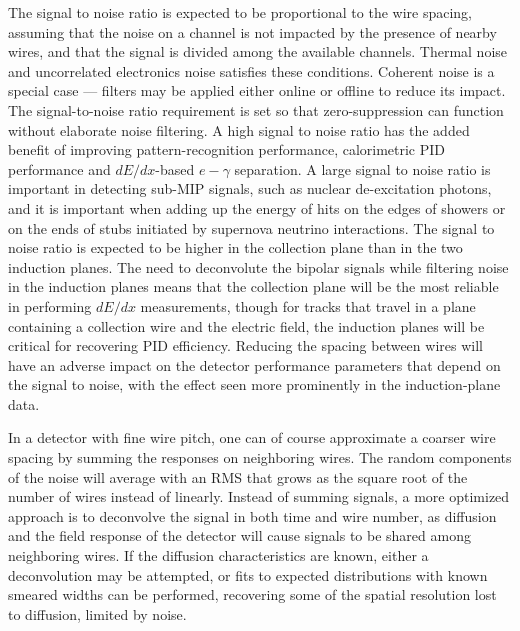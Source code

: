 The signal to noise ratio is expected to be proportional to the wire
spacing, assuming that the noise on a channel is not impacted by the
presence of nearby wires, and that the signal is divided among the
available channels.  Thermal noise and uncorrelated electronics noise
satisfies these conditions.  Coherent noise is a special case ---
filters may be applied either online or offline to reduce its impact.
The signal-to-noise ratio requirement is set so that zero-suppression
can function without elaborate noise filtering.  A high signal to
noise ratio has the added benefit of improving pattern-recognition
performance, calorimetric PID performance and $dE/dx$-based
$e-\gamma$ separation.  A large signal to noise ratio is important in
detecting sub-MIP signals, such as nuclear de-excitation photons, and
it is important when adding up the energy of hits on the edges of
showers or on the ends of stubs initiated by supernova neutrino
interactions.  The signal to noise ratio is expected to be higher in
the collection plane than in the two induction planes.  The need to
deconvolute the bipolar signals while filtering noise in the induction
planes means that the collection plane will be the most reliable in
performing $dE/dx$ measurements, though for tracks that travel in a
plane containing a collection wire and the electric field, the
induction planes will be critical for recovering PID efficiency.
Reducing the spacing between wires will have an adverse impact on the
detector performance parameters that depend on the signal to noise,
with the effect seen more prominently in the induction-plane data.

In a detector with fine wire pitch,
one can of course approximate a coarser wire spacing by summing the responses on neighboring
wires.  The random components of the noise will
average with an RMS that grows as the square root of the number of wires instead of linearly.
Instead of summing signals, a more optimized approach is to deconvolve the signal in both
time and wire number, as diffusion and the field response of the detector will cause
signals to be shared among neighboring wires.  If the diffusion characteristics are known,
either a deconvolution may be attempted, or fits to expected distributions with known
smeared widths can be performed, recovering some of the spatial resolution lost to diffusion,
limited by noise.

